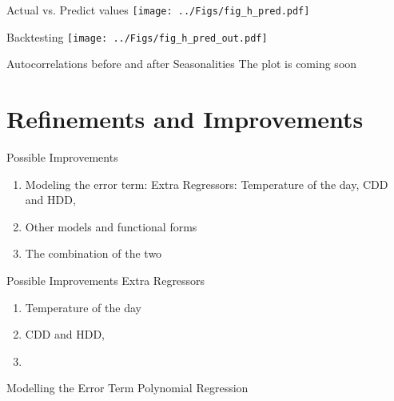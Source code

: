 \documentclass{beamer}
\begin{document}
\begin{frame}{Actual vs. Predict values}
    \texttt{[image: ../Figs/fig\_h\_pred.pdf]}
\end{frame}


\begin{frame}{Backtesting}
    \texttt{[image: ../Figs/fig\_h\_pred\_out.pdf]}
\end{frame}



\begin{frame}{Autocorrelations before and after Seasonalities}
    The plot is coming soon
\end{frame}


\section{Refinements and Improvements}

\begin{frame}{Possible Improvements}
    \begin{enumerate}[label=(\roman*)]
        \item Modeling the error term:
              Extra Regressors: Temperature of the day, CDD and HDD,

        \item Other models and functional forms

        \item The combination of the two
    \end{enumerate}
\end{frame}


\begin{frame}{Possible Improvements}
    Extra Regressors
    \begin{enumerate}[label=(\roman*)]
        \item Temperature of the day

        \item CDD and HDD,

        \item
    \end{enumerate}
\end{frame}


\begin{frame}{Modelling the Error Term}
    Polynomial Regression
\end{frame}
\end{document}

